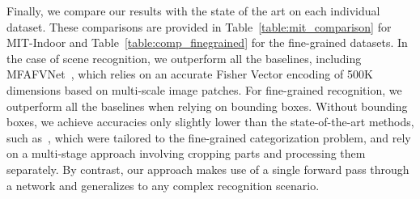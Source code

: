\documentclass{bmvc2k}
\begin{document}
Finally, we compare our results with the state of the art on each individual dataset. These comparisons are provided in Table~\ref{table:mit_comparison} for MIT-Indoor and Table~\ref{table:comp_finegrained} for the fine-grained datasets. In the case of scene recognition, we outperform all the baselines, including MFAFVNet~\cite{mfafvnet}, which relies on an accurate Fisher Vector encoding of 500K dimensions based on multi-scale image patches. For fine-grained recognition, we outperform all the baselines when relying on bounding boxes. Without bounding boxes, we achieve accuracies only slightly lower than the state-of-the-art methods, such as~\cite{RACNN2017,MACNN2017}, which were tailored to the fine-grained categorization problem, and rely on a multi-stage approach involving cropping parts and processing them separately. By contrast, our approach makes use of a single forward pass through a network and generalizes to any complex recognition scenario.
\end{document}
